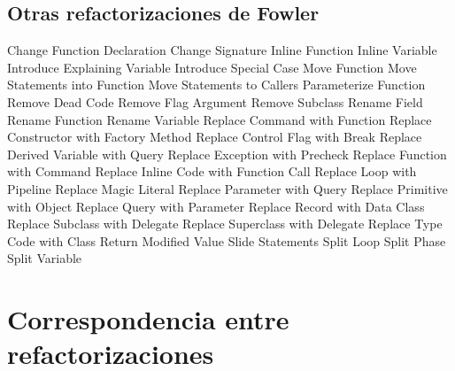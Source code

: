 \documentclass[11pt,a4paper,oneside]{book}
\begin{document}
\section{Otras refactorizaciones de Fowler}
Change Function Declaration
Change Signature 
Inline Function
Inline Variable
Introduce Explaining Variable
Introduce Special Case
Move Function
Move Statements into Function
Move Statements to Callers
Parameterize Function
Remove Dead Code
Remove Flag Argument
Remove Subclass
Rename Field
Rename Function 
Rename Variable
Replace Command with Function
Replace Constructor with Factory Method
Replace Control Flag with Break
Replace Derived Variable with Query
Replace Exception with Precheck
Replace Function with Command
Replace Inline Code with Function Call
Replace Loop with Pipeline
Replace Magic Literal
Replace Parameter with Query
Replace Primitive with Object
Replace Query with Parameter
Replace Record with Data Class
Replace Subclass with Delegate
Replace Superclass with Delegate
Replace Type Code with Class
Return Modified Value
Slide Statements
Split Loop
Split Phase
Split Variable



\chapter*{Correspondencia entre refactorizaciones}
\end{document}

